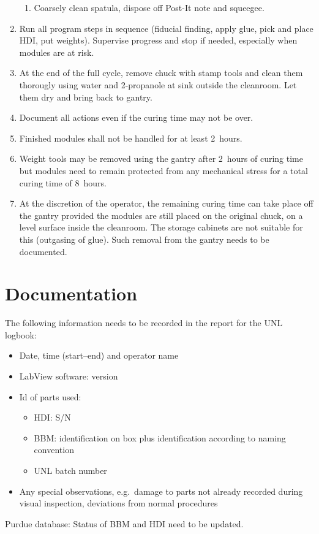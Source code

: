 \documentclass[12pt]{unlsilabsop}
\begin{document}
\begin{enumerate}
\begin{enumerate}
	\item Coarsely clean spatula, dispose off Post-It note and squeegee.
    \end{enumerate}
    \item Run all program steps in sequence (fiducial finding, apply glue, pick and place HDI, put weights). Supervise progress and stop if needed, especially when modules are at risk.
    \item At the end of the full cycle, remove chuck with stamp tools and clean them thorougly using water and 2-propanole at sink outside the cleanroom. Let them dry and bring back to gantry.
    \item Document all actions even if the curing time may not be over.
    \item Finished modules shall not be handled for at least 2~hours.
    \item Weight tools may be removed using the gantry after 2~hours of curing time but modules need to remain protected from any mechanical stress for a total curing time of 8~hours.
    \item At the discretion of the operator, the remaining curing time can take place off the gantry provided the modules are still placed on the original chuck, on a level surface inside the cleanroom. The storage cabinets are not suitable for this (outgasing of glue). Such removal from the gantry needs to be documented.
\end{enumerate}

\section{Documentation}
The following information needs to be recorded in the report for the UNL logbook:
\begin{itemize}
    \item Date, time (start--end) and operator name
    \item LabView software: version
    \item Id of parts used:
	\begin{itemize}
	    \item HDI: S/N
	    \item BBM: identification on box plus identification according to naming convention
	    \item UNL batch number
	\end{itemize}
    \item Any special observations, e.g.~damage to parts not already recorded during visual inspection, deviations from normal procedures
\end{itemize}

Purdue database: Status of BBM and HDI need to be updated.
\end{document}
